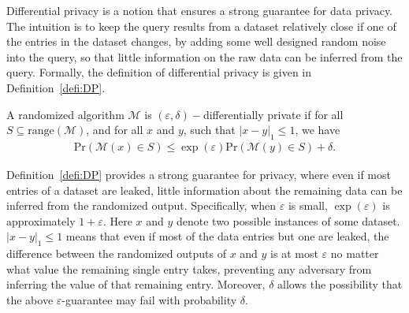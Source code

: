 Differential privacy \cite{dwork2014algorithmic,zhou2010security} is a notion that ensures a strong guarantee for data privacy. The intuition is to keep the query results from a dataset relatively close if one of the entries in the dataset changes, by adding some well designed random noise into the query, so that little information on the raw data can be inferred from the query. Formally, the definition of differential privacy is given in Definition~\ref{defi:DP}.
\begin{defi}\label{defi:DP}
A randomized algorithm $\mathcal{M}$ is $(\varepsilon, \delta)-$differentially private if for all $S\subseteq\text{range}(\mathcal{M})$, and for all $x$ and $y$, such that $|x-y|_1\le 1$, we have
\begin{align}
\text{Pr}(\mathcal{M}(x)\in S)\le \exp(\varepsilon)\text{Pr}(\mathcal{M}(y) \in S)+\delta.
\end{align}

\end{defi}
Definition~\ref{defi:DP} provides a strong guarantee for privacy, where even if most entries of a dataset are leaked, little information about the remaining data can be inferred from the randomized output. Specifically, when $\varepsilon$ is small, $\exp(\varepsilon)$ is approximately $1+\varepsilon$. Here $x$ and $y$ denote two possible instances of some dataset. $|x-y|_1\le 1$ means that even if most of the data entries but one are leaked, the difference between the randomized outputs of $x$ and $y$ is at most $\varepsilon$ no matter what value the remaining single entry takes, preventing any adversary from inferring the value of that remaining entry. Moreover, $\delta$ allows the possibility that the above $\varepsilon$-guarantee may fail with probability $\delta$.

